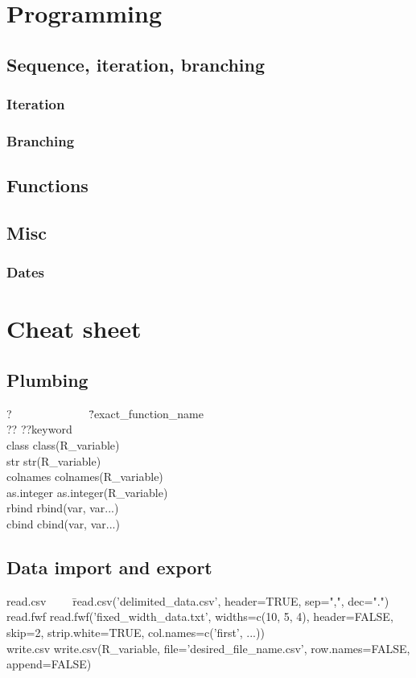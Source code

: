 \documentclass{report}
\begin{document}
\chapter{Programming}
	\section{Sequence, iteration, branching}
		\subsection{Iteration}\label{subsec:iteration}
		\subsection{Branching}\label{subsec:branching}
	\section{Functions}
	\section{Misc}
		\subsection{Dates}\label{subsec:dates}
\chapter{Cheat sheet}

	\section{Plumbing}
\begin{tabbing}
?~~~~~~~~~~~~~ \= ?exact\_function\_name \\
?? \> ??keyword \\
class \> class(R\_variable) \\
str \> str(R\_variable) \\
colnames \> colnames(R\_variable) \\
as.integer \> as.integer(R\_variable) \\
rbind \> rbind(var, var...) \\
cbind \> cbind(var, var...)
\end{tabbing}

	\section{Data import and export}
\begin{tabbing}
read.csv~~~~ \= read.csv('delimited\_data.csv', header=TRUE, sep=",", dec=".") \\
read.fwf \> read.fwf('fixed\_width\_data.txt', widths=c(10, 5, 4), header=FALSE, skip=2, strip.white=TRUE, col.names=c('first', ...)) \\
write.csv \> write.csv(R\_variable, file='desired\_file\_name.csv', row.names=FALSE, append=FALSE)
\end{tabbing}

\printbibliography

\printnoidxglossaries
\end{document}
